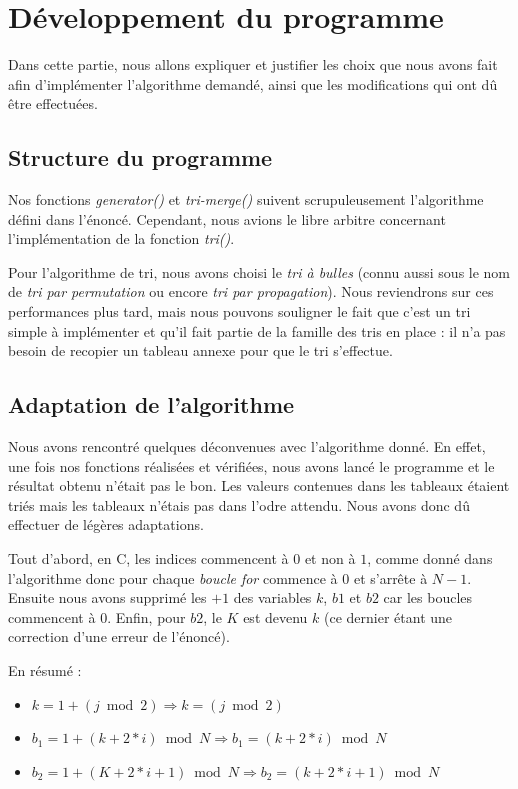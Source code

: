 \documentclass[12pt]{article}
\begin{document}
\section{Développement du programme}

Dans cette partie, nous allons expliquer et justifier les choix que nous avons
fait afin d'implémenter l'algorithme demandé, ainsi que les modifications qui
ont dû être effectuées.

\subsection{Structure du programme}

Nos fonctions \emph{generator()} et \emph{tri-merge()} suivent scrupuleusement
l'algorithme défini dans l'énoncé. Cependant, nous avions le libre arbitre
concernant l'implémentation de la fonction \emph{tri()}.
    
Pour l'algorithme de tri, nous avons choisi le \emph{tri à bulles} (connu aussi
sous le nom de \emph{tri par permutation} ou encore \emph{tri par propagation}).
Nous reviendrons sur ces performances plus tard, mais nous pouvons souligner le
fait que c'est un tri simple à implémenter et qu'il fait partie de la famille
des tris en place : il n'a pas besoin de recopier un tableau annexe pour que le
tri s'effectue. 

\subsection{Adaptation de l'algorithme}

Nous avons rencontré quelques déconvenues avec l'algorithme donné. En effet, une
fois nos fonctions réalisées et vérifiées, nous avons lancé le programme et le
résultat obtenu n'était pas le bon. Les valeurs contenues dans les tableaux
étaient triés mais les tableaux n'étais pas dans l'odre attendu. Nous avons donc
dû effectuer de légères adaptations.

Tout d'abord, en C, les indices commencent à $0$ et non à $1$, comme donné dans
l'algorithme donc pour chaque \emph{boucle for} commence à $0$ et s'arrête à 
$N-1$. Ensuite nous avons supprimé les $+1$ des variables $k$, $b1$ et $b2$ car 
les boucles commencent à 0. Enfin, pour $b2$, le $K$ est devenu $k$ (ce dernier
étant une correction d'une erreur de l'énoncé). 

En résumé :
\begin{itemize}
    \item $k = 1+(j\bmod 2) \Rightarrow k = (j\bmod 2)$
    \item $b_1 = 1+(k+2*i)\bmod N \Rightarrow b_1 = (k+2*i)\bmod N$
    \item $b_2 = 1+(K+2*i+1)\bmod N \Rightarrow b_2 = (k+2*i+1)\bmod N$
\end{itemize}
\end{document}
